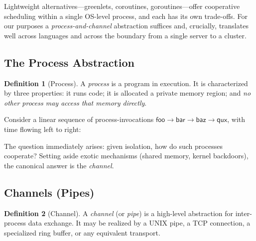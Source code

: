 \documentclass[11pt,a4paper]{article}
\theoremstyle{definition}
\newtheorem{definition}{Definition}[section]
\theoremstyle{remark}
\theoremstyle{plain}
\begin{document}
Lightweight alternatives---greenlets, coroutines, goroutines---offer
cooperative scheduling within a single OS-level process, and each has its
own trade-offs. For our purposes a \emph{process-and-channel} abstraction
suffices and, crucially, translates well across languages and across the
boundary from a single server to a cluster.

\subsection{The Process Abstraction}

\begin{definition}[Process]
A \emph{process} is a program in execution. It is characterized by three
properties: it runs code; it is allocated a private memory region; and
\emph{no other process may access that memory directly}.
\end{definition}

Consider a linear sequence of process-invocations
$\mathsf{foo} \to \mathsf{bar} \to \mathsf{baz} \to \mathsf{qux}$, with
time flowing left to right:

\begin{center}
\end{center}

The question immediately arises: given isolation, how do such processes
cooperate? Setting aside exotic mechanisms (shared memory, kernel
backdoors), the canonical answer is the \emph{channel}.

\subsection{Channels (Pipes)}

\begin{definition}[Channel]
A \emph{channel} (or \emph{pipe}) is a high-level abstraction for
inter-process data exchange. It may be realized by a UNIX pipe, a TCP
connection, a specialized ring buffer, or any equivalent transport.
\end{definition}
\end{document}

